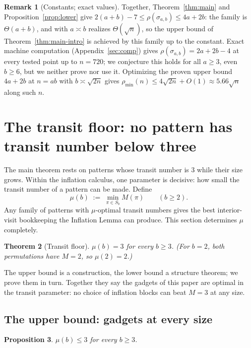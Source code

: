 \documentclass[11pt]{article}
\newtheorem{theorem}{Theorem}[section]
\newtheorem{proposition}[theorem]{Proposition}
\theoremstyle{definition}
\newtheorem{remark}[theorem]{Remark}
\newcommand{\pmin}{\rho_{\min}}
\begin{document}
\begin{remark}[Constants; exact values]\label{rem:constants}
Together, Theorem~\ref{thm:main} and Proposition~\ref{prop:lower} give
$2(a+b) - 7 \le \rho(\sigma_{a,b}) \le 4a + 2b$: the family is $\Theta(a + b)$, and with
$a \asymp b$ realizes $\Theta(\sqrt n)$, so the upper bound of
Theorem~\ref{thm:main-intro} is achieved by this family up to the constant. Exact
machine computation (Appendix~\ref{sec:comp}) gives $\rho(\sigma_{a,b}) = 2a + 2b - 4$ at
every tested point up to $n = 720$; we conjecture this holds for all $a \ge 3$, even
$b \ge 6$, but we neither prove nor use it. Optimizing the proven upper bound $4a + 2b$
at $n = ab$ with $b \asymp \sqrt{2n}$ gives $\pmin(n) \le 4\sqrt{2n} + O(1) \approx
5.66\sqrt n$ along such $n$.
\end{remark}

\section{The transit floor: no pattern has transit number below three}
\label{sec:floor}

The main theorem rests on patterns whose transit number is $3$ while their size grows.
Within the inflation calculus, one parameter is decisive: how small the transit number
of a pattern can be made. Define
\[
  \mu(b) \;:=\; \min_{\pi \in S_b} M(\pi) \qquad (b \ge 2).
\]
Any family of patterns with $\mu$-optimal transit numbers gives the best interior-visit
bookkeeping the Inflation Lemma can produce. This section determines $\mu$ completely.

\begin{theorem}[Transit floor]\label{thm:floor}
$\mu(b) = 3$ for every $b \ge 3$. (For $b = 2$, both permutations have $M = 2$, so
$\mu(2) = 2$.)
\end{theorem}

The upper bound is a construction, the lower bound a structure theorem; we prove them
in turn. Together they say the gadgets of this paper are optimal in the transit
parameter: no choice of inflation blocks can beat $M = 3$ at any size.

\subsection{The upper bound: gadgets at every size}

\begin{proposition}\label{prop:floor-upper}
$\mu(b) \le 3$ for every $b \ge 3$.
\end{proposition}
\end{document}
